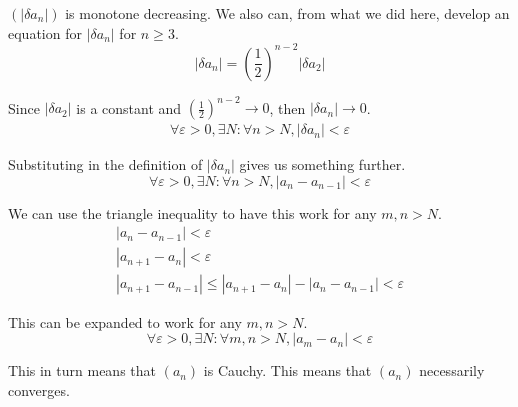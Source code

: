 \documentclass[12pt]{report}
\begin{document}
        $\left( \left| \delta a_n \right| \right)$ is monotone decreasing.
        We also can, from what we did here, develop an equation for $\left| \delta a_n \right|$ for $n \geq 3$.
        \begin{equation}
            \left| \delta a_n \right| = \left( \frac{1}{2} \right)^{n - 2} \left| \delta a_2 \right|
        \end{equation}

        Since $\left| \delta a_2 \right|$ is a constant and $\left( \frac{1}{2} \right)^{n - 2} \to 0$, then $\left| \delta a_n \right| \to 0$.
        \begin{gather}
            \forall \varepsilon > 0, \exists N : \forall n > N, \left| \delta a_n \right| < \varepsilon
        \end{gather}

        Substituting in the definition of $\left| \delta a_n \right|$ gives us something further.
        \begin{equation}
            \forall \varepsilon > 0, \exists N : \forall n > N, \left| a_n - a_{n - 1} \right| < \varepsilon
        \end{equation}

        We can use the triangle inequality to have this work for any $m, n > N$.
        \begin{gather}
            \left| a_n - a_{n - 1} \right| < \varepsilon\\
            \left| a_{n + 1} - a_n \right| < \varepsilon\\
            \left| a_{n + 1} - a_{n - 1} \right| \leq \left| a_{n + 1} - a_n \right| - \left| a_n - a_{n - 1} \right| < \varepsilon
        \end{gather}

        This can be expanded to work for any $m, n > N$.
        \begin{equation}
            \forall \varepsilon > 0, \exists N : \forall m, n > N, \left| a_m - a_n \right| < \varepsilon
        \end{equation}
        
        This in turn means that $(a_n)$ is Cauchy.
        This means that $(a_n)$ necessarily converges.

        
\end{document}
